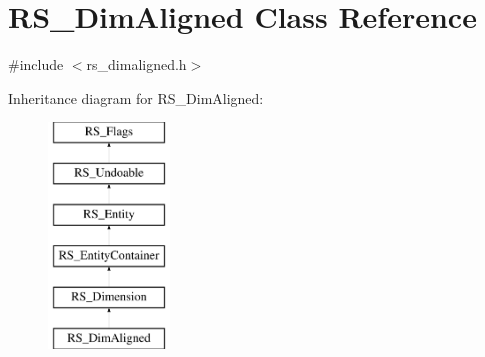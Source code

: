 \hypertarget{classRS__DimAligned}{\section{R\-S\-\_\-\-Dim\-Aligned Class Reference}
\label{classRS__DimAligned}
}


{\ttfamily \#include $<$rs\-\_\-dimaligned.\-h$>$}

Inheritance diagram for R\-S\-\_\-\-Dim\-Aligned\-:\begin{figure}[H]
\begin{center}
\leavevmode
\includegraphics[height=6.000000cm]{classRS__DimAligned}
\end{center}
\end{figure}

